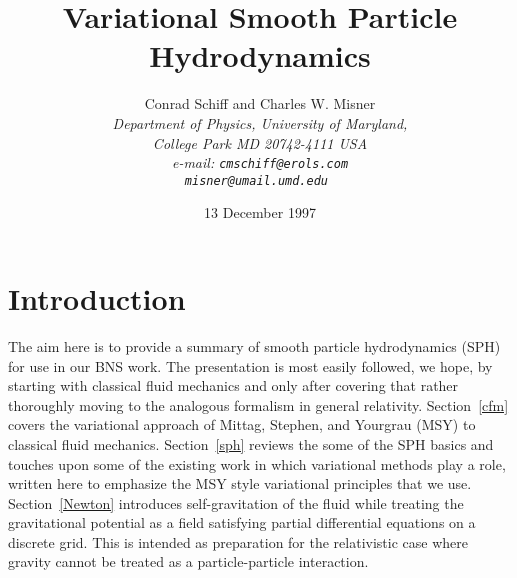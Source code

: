 
\def\a{{\vec a}}
\def\x{{\vec x}}
\def\z{{\vec z}}



\title{Variational Smooth Particle Hydrodynamics}
%
\author{   \sc
             Conrad Schiff {\rm and} Charles W. Misner\\
           \em
            Department of Physics, University of Maryland,
           \\
            College Park MD 20742-4111 USA\\
           \rm
         e-mail: \tt  cmschiff@erols.com\\
                     misner@umail.umd.edu
        }
\date{13 December 1997}
% 
\maketitle

\section{Introduction}

The aim here is to provide a summary of smooth particle hydrodynamics
(SPH) for use in our BNS work. 
    The presentation is most easily followed, we hope, by starting
with classical fluid mechanics and only after covering that rather
thoroughly moving to the analogous formalism in general relativity. 
    Section~\ref{cfm} covers the variational approach of Mittag,
Stephen, and Yourgrau (MSY) to classical fluid mechanics.  
    Section~\ref{sph} reviews the some of the SPH basics and touches
upon some of the existing work in which variational methods play a
role, written here to emphasize the MSY style variational principles
that we use.
    Section~\ref{Newton} introduces self-gravitation of the fluid
while treating the gravitational potential as a field satisfying
partial differential equations on a discrete grid.
    This is intended as preparation for the relativistic case where
gravity cannot be treated as a particle-particle interaction.


